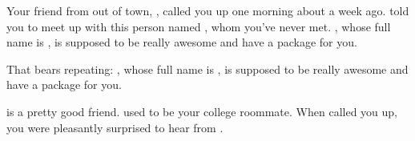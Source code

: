 \documentclass[char]{guildcamp3}
\begin{document}
\name{\cNobleOne{}}

\updatemacro{\cNPC}{
  \unknownplayer %
  }





Your friend from out of town, \cSomeGuy{\intro}, called you up one
morning about a week ago.  \cSomeGuy{} told you to meet up with this
person named \cNPC{}, whom you've never met.  \cNPC{}, whose full name
is \cNPC{\intro}, is supposed to be really awesome and have a package
for you.

That bears repeating: \cNPC{\nick{\informal}}, whose full name is
\cNPC{\full}, is supposed to be really awesome and have a package for
you.

\cSomeGuy{} is a pretty good friend.  \cSomeGuy{\They} used to be your
college roommate.  When \cSomeGuy{\they} called you up, you were
pleasantly surprised to hear from \cSomeGuy{\them}.
\end{document}
